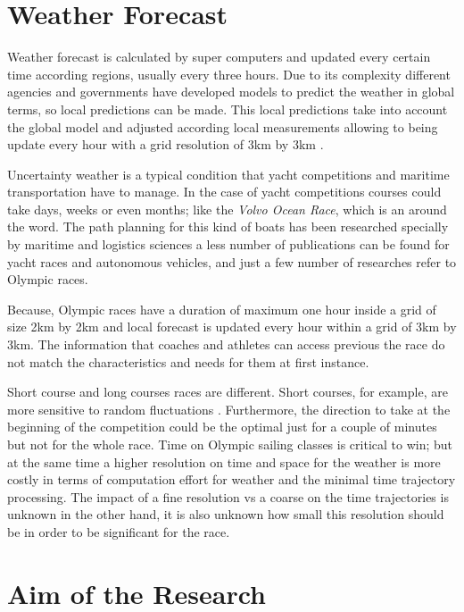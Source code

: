 \section{Weather Forecast}
Weather forecast is calculated by super computers and updated every certain time according regions, usually every three hours. Due to its complexity different agencies and governments have developed models to predict the weather in global terms, so local predictions can be made. This local predictions take into account the global model and adjusted according local measurements allowing to being update every hour with a grid resolution of 3km by 3km \cite{warner2010numerical}. \par

Uncertainty weather is a typical condition that yacht competitions and maritime transportation have to manage. In the case of yacht competitions courses could take days, weeks or even months; like the \textit{Volvo Ocean Race}, which is an around the word. The path planning for this kind of boats has been researched specially by maritime and logistics sciences a less number of publications can be found for yacht races and autonomous vehicles, and just a few number of researches refer to Olympic races. \par  

 Because, Olympic races have a duration of maximum one hour inside a grid of size 2km by 2km and local forecast is updated every hour within a grid of 3km by 3km. The information that coaches and athletes can access previous the race do not match the characteristics and needs for them at first instance.\par 
 
 Short course and long courses races are different. Short courses, for example, are more sensitive to random fluctuations \cite{philpott2001optimising}. Furthermore, the direction to take at the beginning of the competition could be the optimal just for a couple of minutes but not for the whole race. Time on Olympic sailing classes is critical to win; but at the same time a higher resolution on time and space for the weather is more costly in terms of computation effort for weather and the minimal time trajectory processing. The impact of a fine resolution vs a coarse on the time trajectories is unknown in the other hand, it is also unknown how small this resolution should be in order to be significant for the  race.\par 
 
 \section{Aim of the Research}
 
